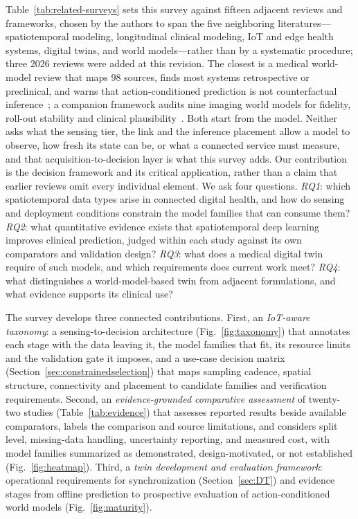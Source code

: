 \documentclass[journal]{IEEEtran}
\begin{document}
Table~\ref{tab:related-surveys} sets this survey against fifteen adjacent reviews and frameworks, chosen by the authors to span the five neighboring literatures---spatiotemporal modeling, longitudinal clinical modeling, IoT and edge health systems, digital twins, and world models---rather than by a systematic procedure; three 2026 reviews were added at this revision. The closest is a medical world-model review that maps 98 sources, finds most systems retrospective or preclinical, and warns that action-conditioned prediction is not counterfactual inference~\cite{chen2026medicalwm}; a companion framework audits nine imaging world models for fidelity, roll-out stability and clinical plausibility~\cite{wimalasiri2026verifiable}. Both start from the model. Neither asks what the sensing tier, the link and the inference placement allow a model to observe, how fresh its state can be, or what a connected service must measure, and that acquisition-to-decision layer is what this survey adds. Our contribution is the decision framework and its critical application, rather than a claim that earlier reviews omit every individual element. We ask four questions. \emph{RQ1}: which spatiotemporal data types arise in connected digital health, and how do sensing and deployment conditions constrain the model families that can consume them? \emph{RQ2}: what quantitative evidence exists that spatiotemporal deep learning improves clinical prediction, judged within each study against its own comparators and validation design? \emph{RQ3}: what does a medical digital twin require of such models, and which requirements does current work meet? \emph{RQ4}: what distinguishes a world-model-based twin from adjacent formulations, and what evidence supports its clinical use?

The survey develops three connected contributions. First, an \emph{IoT-aware taxonomy}: a sensing-to-decision architecture (Fig.~\ref{fig:taxonomy}) that annotates each stage with the data leaving it, the model families that fit, its resource limits and the validation gate it imposes, and a use-case decision matrix (Section~\ref{sec:constrainedselection}) that maps sampling cadence, spatial structure, connectivity and placement to candidate families and verification requirements. Second, an \emph{evidence-grounded comparative assessment} of twenty-two studies (Table~\ref{tab:evidence}) that assesses reported results beside available comparators, labels the comparison and source limitations, and considers split level, missing-data handling, uncertainty reporting, and measured cost, with model families summarized as demonstrated, design-motivated, or not established (Fig.~\ref{fig:heatmap}). Third, a \emph{twin development and evaluation framework}: operational requirements for synchronization (Section~\ref{sec:DT}) and evidence stages from offline prediction to prospective evaluation of action-conditioned world models (Fig.~\ref{fig:maturity}).
\end{document}
